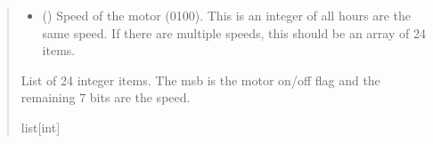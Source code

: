 \documentclass[letterpaper,10pt,english]{sphinxmanual}
\begin{document}
\begin{fulllineitems}
\begin{fulllineitems}
\begin{quote}
\begin{description}
\begin{itemize}
\item {} 
\sphinxAtStartPar
{} (\sphinxstyleliteralemphasis{\sphinxupquote{ | }}\sphinxstyleliteralemphasis{\sphinxupquote{ | }}\sphinxstyleliteralemphasis{\sphinxupquote{{[}}}\sphinxstyleliteralemphasis{\sphinxupquote{{]}}}) \textendash{} Speed of the motor (0\sphinxhyphen{}100). This is an integer of all hours                 are the same speed. If there are multiple speeds, this should be an array of 24 items.

\end{itemize}

\sphinxAtStartPar
List of 24 integer items. The msb is the motor on/off flag and the remaining 7 bits                 are the speed.

\sphinxAtStartPar
list{[}int{]}

\end{description}\end{quote}

\end{fulllineitems}


\begin{fulllineitems}
\label{\detokenize{PodApi.Devices:PodApi.Devices.PodDevice_8229.Pod8229.DecodeDayAndSchedule}}
\pysigstartsignatures
{}
\pysigstopsignatures
\end{fulllineitems}



\end{fulllineitems}
\end{document}
